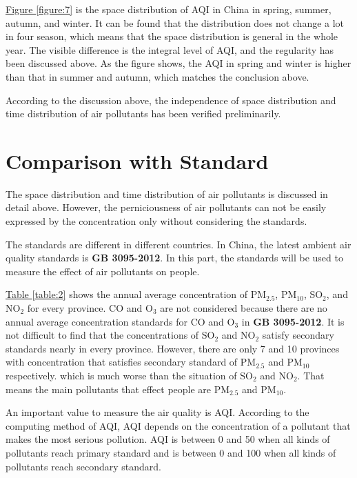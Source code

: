 \documentclass[letterpaper]{article}
\begin{document}
\begin{CJK*}{UTF8}{gkai}
\hyperref[figure:7]{Figure \ref*{figure:7}} is the space distribution of AQI in China in spring, summer, autumn, and winter. It can be found that the distribution does not change a lot in four season, which means that the space distribution is general in the whole year. The visible difference is the integral level of AQI, and the regularity has been discussed above. As the figure shows, the AQI in spring and winter is higher than that in summer and autumn, which matches the conclusion above.

According to the discussion above, the independence of space distribution and time distribution of air pollutants has been verified preliminarily.

\section{Comparison with Standard}

The space distribution and time distribution of air pollutants is discussed in detail above. However, the perniciousness of air pollutants can not be easily expressed by the concentration only without considering the standards.

The standards are different in different countries. In China, the latest ambient air quality standards is \textbf{GB 3095-2012}. In this part, the standards will be used to measure the effect of air pollutants on people.

\hyperref[table:2]{Table \ref*{table:2}} shows the annual average concentration of PM$_{2.5}$, PM$_{10}$, SO$_{2}$, and NO$_{2}$ for every province. CO and O$_{3}$ are not considered because there are no annual average concentration standards for CO and O$_{3}$ in \textbf{GB 3095-2012}. It is not difficult to find that the concentrations of SO$_{2}$ and NO$_{2}$ satisfy secondary standards nearly in every province. However, there are only 7 and 10 provinces with concentration that satisfies secondary standard of PM$_{2.5}$ and PM$_{10}$ respectively. which is much worse than the situation of SO$_{2}$ and NO$_{2}$. That means the main pollutants that effect people are PM$_{2.5}$ and PM$_{10}$.

An important value to measure the air quality is AQI. According to the computing method of AQI, AQI depends on the concentration of a pollutant that makes the most serious pollution. AQI is between 0 and 50 when all kinds of pollutants reach primary standard and is between 0 and 100 when all kinds of pollutants reach secondary standard.



\end{CJK*}
\end{document}
